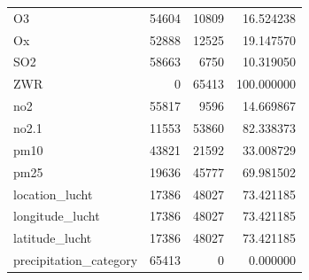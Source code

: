 \begin{tabular}{lrrr}
O3 & 54604 & 10809 & 16.524238 \\
Ox & 52888 & 12525 & 19.147570 \\
SO2 & 58663 & 6750 & 10.319050 \\
ZWR & 0 & 65413 & 100.000000 \\
no2 & 55817 & 9596 & 14.669867 \\
no2.1 & 11553 & 53860 & 82.338373 \\
pm10 & 43821 & 21592 & 33.008729 \\
pm25 & 19636 & 45777 & 69.981502 \\
location_lucht & 17386 & 48027 & 73.421185 \\
longitude_lucht & 17386 & 48027 & 73.421185 \\
latitude_lucht & 17386 & 48027 & 73.421185 \\
precipitation_category & 65413 & 0 & 0.000000 \\
\bottomrule
\end{tabular}
